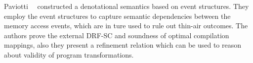 Paviotti~\etal~\cite{Paviotti-al:ESOP20} constructed a 
denotational semantics based on event structures. 
They employ the event structures to capture 
semantic dependencies between the memory access events, 
which are in ture used to rule out thin-air outcomes.
The authors prove the external DRF-SC and 
soundness of optimal compilation mappings,
also they present a refinement relation which 
can be used to reason about validity of program transformations. 


\newpage
\onecolumn

